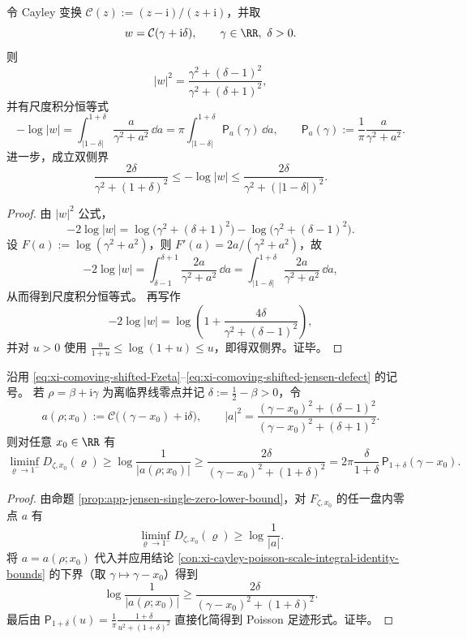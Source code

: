 \begin{conclusion}\label{con:xi-cayley-poisson-scale-integral-identity-bounds}
令 Cayley 变换 \(\mathcal C(z):=(z-\mathrm{i})/(z+\mathrm{i})\)，并取
\[
w=\mathcal C(\gamma+\mathrm{i}\delta),\qquad \gamma\in\RR,\ \delta>0.
\]
则
\[
|w|^2=\frac{\gamma^2+(\delta-1)^2}{\gamma^2+(\delta+1)^2},
\]
并有尺度积分恒等式
\[
-\log|w|
=\int_{|1-\delta|}^{1+\delta}\frac{a}{\gamma^2+a^2}\,\dd a
=\pi\int_{|1-\delta|}^{1+\delta}\mathsf P_a(\gamma)\,\dd a,
\qquad
\mathsf P_a(\gamma):=\frac1\pi\frac{a}{\gamma^2+a^2}.
\]
进一步，成立双侧界
\[
\frac{2\delta}{\gamma^2+(1+\delta)^2}
\le
-\log|w|
\le
\frac{2\delta}{\gamma^2+(|1-\delta|)^2}.
\]
\end{conclusion}
\begin{proof}
由 \(|w|^2\) 公式，
\[
-2\log|w|
=\log\!\bigl(\gamma^2+(\delta+1)^2\bigr)-\log\!\bigl(\gamma^2+(\delta-1)^2\bigr).
\]
设 \(F(a):=\log(\gamma^2+a^2)\)，则 \(F'(a)=2a/(\gamma^2+a^2)\)，故
\[
-2\log|w|
=\int_{\delta-1}^{\delta+1}\frac{2a}{\gamma^2+a^2}\,\dd a
=\int_{|1-\delta|}^{1+\delta}\frac{2a}{\gamma^2+a^2}\,\dd a,
\]
从而得到尺度积分恒等式。
再写作
\[
-2\log|w|
=\log\!\left(1+\frac{4\delta}{\gamma^2+(\delta-1)^2}\right),
\]
并对 \(u>0\) 使用
\(
\frac{u}{1+u}\le\log(1+u)\le u
\)，即得双侧界。证毕。
\end{proof}

\begin{conclusion}\label{con:xi-jensen-defect-poisson-footprint-lower-bound}
沿用 \eqref{eq:xi-comoving-shifted-Fzeta}--\eqref{eq:xi-comoving-shifted-jensen-defect} 的记号。
若 \(\rho=\beta+\mathrm{i}\gamma\) 为离临界线零点并记 \(\delta:=\frac12-\beta>0\)，令
\[
a(\rho;x_0):=\mathcal C\bigl((\gamma-x_0)+\mathrm{i}\delta\bigr),
\qquad
|a|^2=\frac{(\gamma-x_0)^2+(\delta-1)^2}{(\gamma-x_0)^2+(\delta+1)^2}.
\]
则对任意 \(x_0\in\RR\) 有
\[
\liminf_{\varrho\to1^-}D_{\zeta,x_0}(\varrho)
\ge
\log\frac{1}{|a(\rho;x_0)|}
\ge
\frac{2\delta}{(\gamma-x_0)^2+(1+\delta)^2}
=2\pi\frac{\delta}{1+\delta}\,\mathsf P_{1+\delta}(\gamma-x_0).
\]
\end{conclusion}
\begin{proof}
由命题 \ref{prop:app-jensen-single-zero-lower-bound}，对 \(F_{\zeta,x_0}\) 的任一盘内零点 \(a\) 有
\[
\liminf_{\varrho\to1^-}D_{\zeta,x_0}(\varrho)\ge \log\frac1{|a|}.
\]
将 \(a=a(\rho;x_0)\) 代入并应用结论
\ref{con:xi-cayley-poisson-scale-integral-identity-bounds}
的下界（取 \(\gamma\mapsto \gamma-x_0\)）得到
\[
\log\frac1{|a(\rho;x_0)|}
\ge \frac{2\delta}{(\gamma-x_0)^2+(1+\delta)^2}.
\]
最后由
\(
\mathsf P_{1+\delta}(u)=\frac1\pi\frac{1+\delta}{u^2+(1+\delta)^2}
\)
直接化简得到 Poisson 足迹形式。证毕。
\end{proof}

